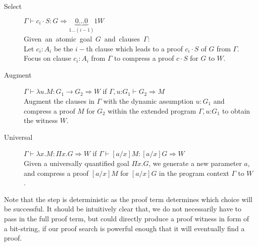 \documentclass{llncs}
\newcommand{\fighead}{\hrule\vspace{1.5ex}}
\newcommand{\vd}{\vdash}
\newcommand{\arrow}{\rightarrow}
\newcommand{\oftp}{\mathord{:}}
\begin{document}
\begin{small}
\begin{description}
\item[Select] $\Gamma \vd c_i \cdot S: G \Rightarrow
  \underset{1 \ldots (i-1)}{\underbrace{0\ldots 0}}1
W $ \\
    \mbox{Given an atomic goal $G$ and clauses $\Gamma$:}\hfill\\
     Let $c_i : A_i$ be the $i-$th clause which leads to a
    proof $c_i\cdot S$ of $G$ from $\Gamma$. \\
    Focus on clause $c_i : A_i$ from $\Gamma$ to compress a proof
     $c\cdot S$ for $G$ to $W$.

\item[Augment] $\Gamma \vd   \lambda u. M : G_1 \arrow G_2 \Rightarrow
  W$ if $\Gamma,
  u\oftp G_1 \vd G_2 \Rightarrow M$ \\
Augment the clauses in $\Gamma$ with the dynamic assumption $u{:} G_1$ and
compress a proof $M$ for $G_2$ within the extended program
$\Gamma, u \oftp G_1$ to obtain the witness $W$. 
\item[Universal] $\Gamma \vd  \lambda x. M : \Pi x. G \Rightarrow W$ if $\Gamma \vd
  [a/x]M: [a/x]G\Rightarrow W$  \\ %
Given a universally quantified goal $\Pi x. G$, we generate a new
parameter $a$, and compress a proof $[a/x]M$  for $[a/x]G$ in the
program context $\Gamma$ to $W$.\\
\end{description}
\end{small}    
%

Note that the {} step is deterministic as the proof term
determines which choice will be successful. It should be intuitively
clear that, we do not necessarily have to pass in the full proof term,
but could directly produce a proof witness in form of a bit-string, if
our proof search is powerful enough that it will eventually find a proof.
\end{document}
